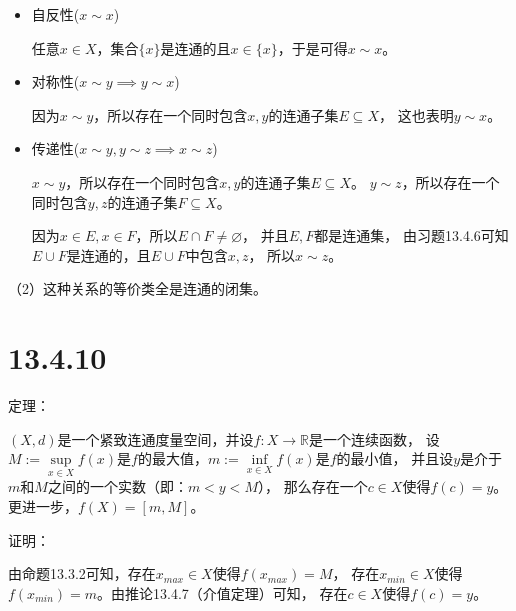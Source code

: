 \documentclass{article}
\begin{document}
\begin{itemize}
  \item 自反性($x \sim x$)

        任意$x \in X$，集合$\{x\}$是连通的且$x \in \{x\}$，于是可得$x \sim x$。

  \item 对称性($x \sim y \implies y \sim x$)

        因为$x \sim y$，所以存在一个同时包含$x, y$的连通子集$E \subseteq X$，
        这也表明$y \sim x$。

  \item 传递性($x \sim y, y \sim z \implies x \sim z$)

        $x \sim y$，所以存在一个同时包含$x, y$的连通子集$E \subseteq X$。
        $y \sim z$，所以存在一个同时包含$y, z$的连通子集$F \subseteq X$。

        因为$x \in E, x \in F$，所以$E \cap F \not = \varnothing$，
        并且$E, F$都是连通集，
        由习题13.4.6可知$E \cup F$是连通的，且$E \cup F$中包含$x, z$，
        所以$x \sim z$。
\end{itemize}

（2）这种关系的等价类全是连通的闭集。


\section*{13.4.10}

定理：

$(X,d)$是一个紧致连通度量空间，并设$f: X \to \mathbb{R}$是一个连续函数，
设$M := \sup\limits_{x \in X} f(x)$是$f$的最大值，$m := \inf\limits_{x \in X} f(x)$是$f$的最小值，
并且设$y$是介于$m$和$M$之间的一个实数（即：$m < y < M$），
那么存在一个$c \in X$使得$f(c) = y$。更进一步，$f(X) = [m, M]$。

证明：

由命题13.3.2可知，存在$x_{max} \in X$使得$f(x_{max}) = M$，
存在$x_{min} \in X$使得$f(x_{min}) = m$。由推论13.4.7（介值定理）可知，
存在$c \in X$使得$f(c) = y$。
\end{document}
